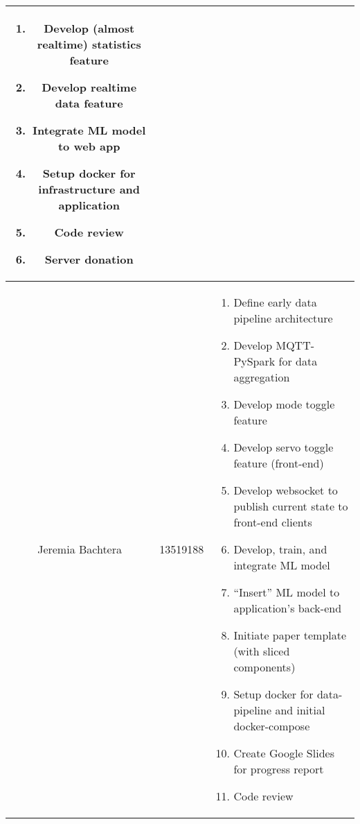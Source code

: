 \begin{table*}[htbp]
\begin{center}
\begin{tabular}{|c|c|p{10cm}|}
\begin{enumerate}[leftmargin=*]
				                                         \item Develop (almost realtime) statistics feature
				                                         \item Develop realtime data feature
				                                         \item Integrate ML model to web app
				                                         \item Setup docker for infrastructure and application
				                                         \item Code review
				                                         \item Server donation
			                                         \end{enumerate}
			\\
			\hline
			Jeremia Bachtera & 13519188            & \begin{enumerate}[leftmargin=*]
				                                         \item Define early data pipeline architecture
				                                         \item Develop MQTT-PySpark for data aggregation
				                                         \item Develop mode toggle feature
				                                         \item Develop servo toggle feature (front-end)
				                                         \item Develop websocket to publish current state to front-end clients
				                                         \item Develop, train, and integrate ML model
				                                         \item ``Insert'' ML model to application's back-end
				                                         \item Initiate paper template (with sliced components)
				                                         \item Setup docker for data-pipeline and initial docker-compose
				                                         \item Create Google Slides for progress report
				                                         \item Code review
			                                         \end{enumerate}
			\\

\end{tabular}
\end{center}
\end{table*}
